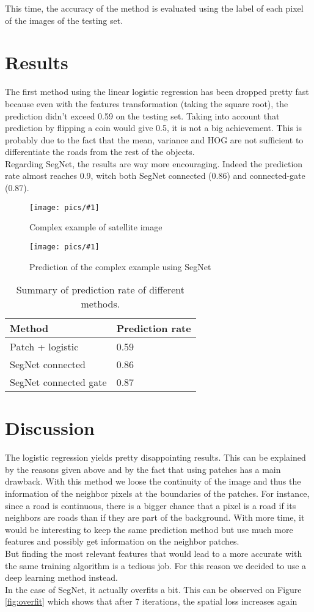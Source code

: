 \documentclass[10pt,conference,compsocconf]{IEEEtran}
\newcommand{\scalefig}[4]{
  \begin{figure}[ht!]
    \centering
    \texttt{[image: pics/\#1]}
 \caption{#3}
    \label{#4}
  \end{figure}}
\begin{document}
This time, the accuracy of the method is evaluated using the label of each pixel of the images of the testing set.

\section{Results}
The first method  using the linear logistic regression has been dropped pretty fast because even with the features transformation (taking the square root), the prediction didn't exceed 0.59 on the testing set. Taking into account that prediction by flipping a coin would give 0.5, it is not a big achievement. This is probably due to the fact that the mean, variance and HOG are not sufficient to differentiate the roads from the rest of the objects. \\
Regarding SegNet, the results are way more encouraging. Indeed the prediction rate almost reaches 0.9, witch both SegNet connected (0.86) and connected-gate (0.87).
\scalefig{pred}{0.9}{Complex example of satellite image}{fig:pred}
\scalefig{pred_label}{0.8}{Prediction of the complex example using SegNet}{fig:pred_label}

\begin{table} [htbp]
  \centering
  \begin{tabular}[c]{|l|l|}
    \hline
    Method & Prediction rate\\
    \hline
    Patch + logistic & 0.59\\
    SegNet connected & 0.86\\
    SegNet connected gate & 0.87\\
    \hline
  \end{tabular}
  \caption{Summary of prediction rate of different methods.}
  \label{tab:results}
\end{table}

\section{Discussion}
The logistic regression yields pretty disappointing results. This can be explained by the reasons given above and by the fact that using patches has a main drawback. With this method we loose the continuity of the image and thus the information of the neighbor pixels at the boundaries of the patches. For instance, since a road is continuous, there is a bigger chance that a pixel is a road if its neighbors are roads than if they are part of the background. With more time, it would be interesting to keep the same prediction method but use much more features and possibly get information on the neighbor patches.\\
But finding the most relevant features that would lead to a more accurate with the same training algorithm is a tedious job. For this reason we decided to use a deep learning method instead.\\
In the case of SegNet, it actually overfits a bit. This can be observed on Figure \ref{fig:overfit} which shows that after 7 iterations, the spatial loss increases again
\end{document}
